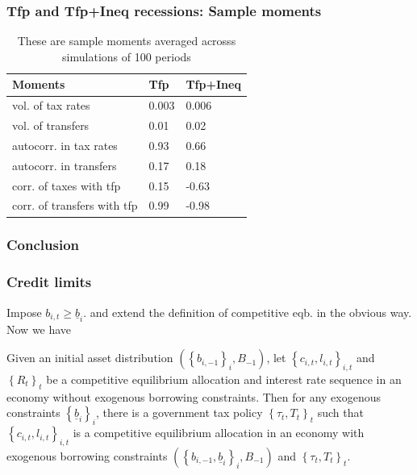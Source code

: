 \documentclass{beamer}
\begin{document}
\begin{frame}
\frametitle{Tfp and Tfp+Ineq recessions: Sample moments}
\begin{table}[htp]
\small
\begin{tabular}{|l|l|l|}
\hline
Moments &Tfp& Tfp+Ineq\\\hline
vol. of tax rates & 0.003&0.006\\
vol. of transfers &0.01 &0.02\\
autocorr. in tax rates& 0.93&0.66\\
autocorr. in transfers& 0.17&0.18\\
corr. of taxes with tfp &0.15 &-0.63\\
corr. of transfers with tfp & 0.99&-0.98\\ \hline
\end{tabular}
\caption{These are sample moments averaged acrosss simulations of 100 periods}
\label{tab:corr}
\end{table}

\end{frame}



\begin{frame}
\frametitle{Conclusion}
\end{frame}

\begin{frame}\label{credit limits}
\frametitle{Credit limits}
Impose $b_{i,t}\geq \underline{b}_i.$ and extend the definition of competitive eqb. in the obvious way. Now we have

\begin{theorem}
\label{thm:borrowing_constraint}  Given an initial asset distribution $\left(
\left\{ b_{i,-1}\right\} _{i},B_{-1}\right)$, let $\left\{ c_{i,t},l_{i,t}\right\} _{i,t}$ and $\left\{ R_{t}\right\}_t $ be a competitive
equilibrium allocation and interest rate sequence in an economy without
exogenous borrowing constraints. Then for any exogenous
constraints $\left\{ \underline{b}_{i}\right\} _{i}$, there is a government
tax policy $\left\{ \tau _{t},T_{t}\right\} _{t}$ such that $\left\{
c_{i,t},l_{i,t}\right\} _{i,t}$ is a competitive equilibrium
allocation in an economy with exogenous borrowing constraints $\left(
\left\{ b_{i,-1},\underline{b}_{i}\right\} _{i},B_{-1}\right) $ and $\left\{
\tau _{t},T_{t}\right\} _{t}.$
\end{theorem}
\hyperlink{ricardian eqv}{}

\end{frame}
\end{document}
